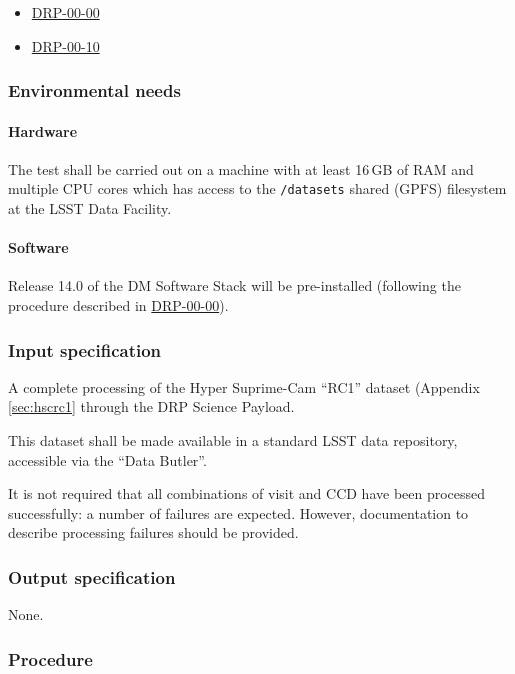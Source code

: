 \begin{itemize}

  \item{\hyperref[drp-00-00]{DRP-00-00}}
  \item{\hyperref[drp-00-10]{DRP-00-10}}

\end{itemize}

\subsubsection{Environmental needs}

\paragraph{Hardware}

The test shall be carried out on a machine with at least 16\,GB of RAM and
multiple CPU cores which has access to the \texttt{/datasets} shared (GPFS)
filesystem at the LSST Data Facility.

\paragraph{Software}

Release 14.0 of the DM Software Stack will be pre-installed (following the
procedure described in \hyperref[drp-00-00]{DRP-00-00}).

\subsubsection{Input specification}

A complete processing of the Hyper Suprime-Cam ``RC1'' dataset (Appendix
\ref{sec:hscrc1} through the DRP Science Payload.

This dataset shall be made available in a standard LSST data repository,
accessible via the ``Data Butler''.

It is not required that all combinations of visit and CCD have been processed
successfully: a number of failures are expected. However, documentation to
describe processing failures should be provided.

\subsubsection{Output specification}

None.

\subsubsection{Procedure}

